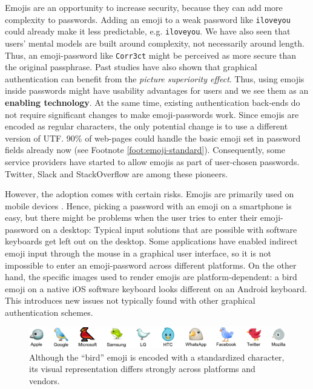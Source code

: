 Emojis are an opportunity to increase security, because they can add more complexity to passwords. Adding an emoji to a weak password like \texttt{iloveyou} could already make it less predictable, e.g. \texttt{iloveyou}. We have also seen that users' mental models are built around complexity, not necessarily around length. Thus, an emoji-password like \texttt{Corr3ct} might be perceived as more secure than the original passphrase. Past studies have also shown that graphical authentication can benefit from the \textit{picture superiority effect}. Thus, using emojis inside passwords might have usability advantages for users and we see them as an \textbf{enabling technology}. At the same time, existing authentication back-ends do not require significant changes to make emoji-passwords work. Since emojis are encoded as regular characters, the only potential change is to use a different version of UTF. 90\% of web-pages could handle the basic emoji set in password fields already now (see Footnote \ref{foot:emoji-standard}). Consequently, some  service providers have started to allow emojis as part of user-chosen passwords. Twitter, Slack and StackOverflow are among these pioneers. 

However, the adoption comes with certain risks. Emojis are primarily used on mobile devices \cite{EmogiResearch2016}. Hence, picking a password with an emoji on a smartphone is easy, but there might be problems when the user tries to enter their emoji-password on a desktop: Typical input solutions that are possible with software keyboards get left out on the desktop. Some applications have enabled indirect emoji input through the mouse in a graphical user interface, so it is not impossible to enter an emoji-password across different platforms. On the other hand, the specific images used to render emojis are platform-dependent: a bird emoji on a native iOS software keyboard looks different on an Android keyboard. This introduces new issues not typically found with other graphical authentication schemes. 

\begin{figure}
	\centering
	\includegraphics[width=\linewidth]{figures/emojipasswords/emoji-bird-comparison}
	\caption{
		\label{fig:emojipasswords:emoji-bird-comparison}
		Although the ``bird'' emoji is encoded with a standardized character, its visual representation differs strongly across platforms and vendors.
	}
	
\end{figure}


